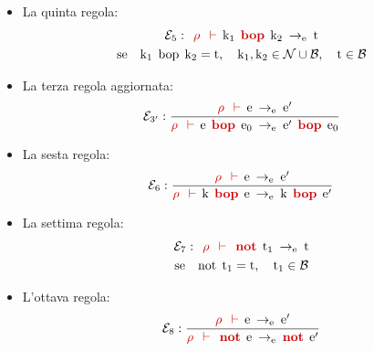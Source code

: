 \documentclass[a4paper]{article}
\begin{document}
\begin{itemize}
		\item La quinta regola:
		\begin{gather*}
			\mathcal{E}_{5} : \:\: \textcolor{Red3}{\rho \:\: \vdash} \:\: \mathrm{k}_{1} \:\: \textcolor{Red3}{\mathbf{bop}} \:\: \mathrm{k}_{2} \: \rightarrow_{\mathrm{e}} \: \mathrm{t} \\
			\mathrm{se} \hspace{1em} \mathrm{k}_{1} \:\: \mathrm{bop} \:\: \mathrm{k}_{2} = \mathrm{t}, \hspace{1em} \mathrm{k_{1},k_{2}} \in \mathcal{N} \cup \mathcal{B}, \hspace{1em} \mathrm{t} \in \mathcal{B}
		\end{gather*}
		
		\item La terza regola aggiornata:
		\begin{equation*}
			\mathcal{E}_{3'} : \dfrac{
				\textcolor{Red3}{\rho \:\: \vdash} \:\: \mathrm{e} \: \rightarrow_{\mathrm{e}} \: \mathrm{e}'
			}{
				\textcolor{Red3}{\rho \:\: \vdash} \:\: \mathrm{e} \:\: \textcolor{Red3}{\mathrm{\mathbf{bop}}} \:\: \mathrm{e}_{0} \: \rightarrow_{\mathrm{e}} \: \mathrm{e}' \:\: \textcolor{Red3}{\mathrm{\mathbf{bop}}} \:\: \mathrm{e}_{0}
			}
		\end{equation*}
		
		\item La sesta regola:
		\begin{equation*}
			\mathcal{E}_{6} : \dfrac{
				\textcolor{Red3}{\rho \:\: \vdash} \:\: \mathrm{e} \: \rightarrow_{\mathrm{e}} \: \mathrm{e}'
			}{
				\textcolor{Red3}{\rho \:\: \vdash} \:\: \mathrm{k} \:\: \textcolor{Red3}{\mathrm{\mathbf{bop}}} \:\: \mathrm{e} \: \rightarrow_{\mathrm{e}} \: \mathrm{k} \:\: \textcolor{Red3}{\mathrm{\mathbf{bop}}} \:\: \mathrm{e}'
			}
		\end{equation*}
		
		\item La settima regola:
		\begin{gather*}
			\mathcal{E}_{7} : \:\: \textcolor{Red3}{\rho \:\: \vdash \:\: \mathbf{not}} \:\: \mathrm{t}_{1} \: \rightarrow_{\mathrm{e}} \: \mathrm{t} \\
			\mathrm{se} \hspace{1em} \mathrm{not} \:\: \mathrm{t}_{1} = \mathrm{t}, \hspace{1em} \mathrm{t}_{1} \in \mathcal{B}
		\end{gather*}
		
		\item L'ottava regola:
		\begin{equation*}
			\mathcal{E}_{8} : \dfrac{
				\textcolor{Red3}{\rho \:\: \vdash} \:\: \mathrm{e} \: \rightarrow_{\mathrm{e}} \: \mathrm{e}'
			}{
				\textcolor{Red3}{\rho \:\: \vdash \:\: \mathbf{not}} \:\: \mathrm{e} \: \rightarrow_{\mathrm{e}} \: \textcolor{Red3}{\mathbf{not}} \:\: \mathrm{e}'
			}
		\end{equation*}
	\end{itemize}\newpage
\end{document}
